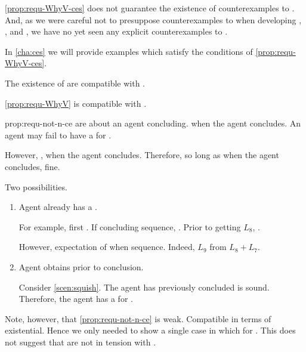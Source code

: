 \begin{note}
  \autoref{prop:requ-WhyV-ces} does not guarantee the existence of counterexamples to \issueConstraint{}.
  And, as we were careful not to presuppose counterexamples to \issueConstraint{} when developing , , and , we have no yet seen any explicit counterexamples to \issueConstraint{}.

  In \autoref{cha:ces} we will provide examples which satisfy the conditions of \autoref{prop:requ-WhyV-ces}.
\end{note}

\begin{note}
  The existence of  are compatible with \issueConstraint{}.

  \begin{observation}%
    \label{prop:requ-not-n-ce}%
    \autoref{prop:requ-WhyV} is compatible with \issueConstraint{}.
  \end{observation}

  \begin{motivation}{prop:requ-not-n-ce}
     are about an agent concluding.
    \fc{} when the agent concludes.
    An agent may fail to have a \wit{} for \fc{}.

    However, \issueConstraint{}, \wit{} when the agent concludes.
    Therefore, so long as \wit{} when the agent concludes, fine.

    Two possibilities.
    \begin{enumerate}
    \item
      Agent already has a \wit{}.

      For example, first .
      If concluding sequence, \fc{}.
      Prior to getting \(L_{8}\), \fc{}.

      However, expectation of \wit{} when sequence.
      Indeed, \(L_{9}\) from \(L_{8} + L_{7}\).
    \item
      Agent obtains \wit{} prior to conclusion.

      Consider \autoref{scen:squish}.
      The agent has previously concluded \sqE{} is sound.
      Therefore, the agent has a \wit{} for \ros{}.
    \end{enumerate}
  \end{motivation}

  Note, however, that \autoref{prop:requ-not-n-ce} is weak.
  Compatible in terms of existential.
  Hence we only needed to show a single case in which \wit{} for \requ{}.
  This does not suggest that  are not in tension with \issueConstraint{}.
\end{note}

